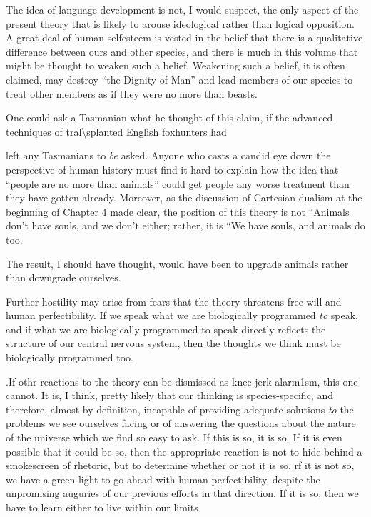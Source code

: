 The idea of language development is not, I would suspect, the only aspect of the present theory that is likely to arouse ideological rather than logical opposition. A great deal of human self{\textquotedbl}esteem is vested in the belief that there is a qualitative difference between ours and other species, and there is much in this volume that might be thought to weaken such a belief. Weakening such a belief, it is often claimed, may destroy ``the Dignity of Man'' and lead members of our species to treat other members as if they were no more than beasts.

One could ask a Tasmanian what he thought of this claim, if the advanced techniques of tral{\textbackslash}splanted English foxhunters had


left any Tasmanians to \textit{be} asked. Anyone who casts a candid eye down the perspective of human history must find it hard to explain how the idea that ``people are no more than animals'' could get people any worse treatment than they have gotten already. Moreover, as the discussion of Cartesian dualism at the beginning of Chapter 4 made clear, the position of this theory is not ``Animals don't have souls, and we don't either{\textquotedbl}; rather, it is ``We have souls, and animals do too.{\textquotedbl}

The result, I should have thought, would have been to upgrade animals rather than downgrade ourselves.

Further hostility may arise from fears that the theory threatens free will and human perfectibility. If we speak what we are biologically programmed \textit{to} speak, and if what we are biologically programmed to speak directly reflects the structure of our central nervous system, then the thoughts we think must be biologically programmed too.

.If othr reactions to the theory can be dismissed as knee-jerk alarm1sm, this one cannot. It is, I think, pretty likely that our think\-ing is species-specific, and therefore, almost by definition, incapable of providing adequate solutions \textit{to }the problems we see ourselves facing or of answering the questions about the nature of the universe which we find so easy to ask. If this is so, it is so. If it is even possible that it could be so, then the appropriate reaction is not to hide behind a smokescreen of rhetoric, but to determine whether or not it is so. rf it is not so, we have a green light to go ahead with human perfectibility, despite the unpromising auguries of our previous efforts in that direc\-tion. If it is so, then we have to learn either to live within our limits

